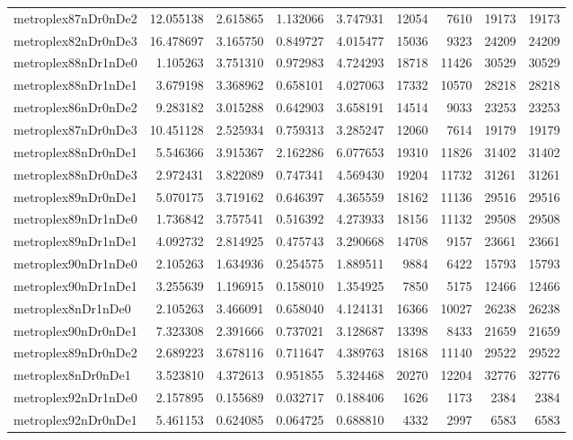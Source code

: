 \begin{longtable}{|l|r|r|r|r|r|r|r|r|}
metroplex87nDr0nDe2 & 12.055138 & 2.615865 & 1.132066 & 3.747931 & 12054 & 7610 & 19173 & 19173 \\
metroplex82nDr0nDe3 & 16.478697 & 3.165750 & 0.849727 & 4.015477 & 15036 & 9323 & 24209 & 24209 \\
metroplex88nDr1nDe0 & 1.105263 & 3.751310 & 0.972983 & 4.724293 & 18718 & 11426 & 30529 & 30529 \\
metroplex88nDr1nDe1 & 3.679198 & 3.368962 & 0.658101 & 4.027063 & 17332 & 10570 & 28218 & 28218 \\
metroplex86nDr0nDe2 & 9.283182 & 3.015288 & 0.642903 & 3.658191 & 14514 & 9033 & 23253 & 23253 \\
metroplex87nDr0nDe3 & 10.451128 & 2.525934 & 0.759313 & 3.285247 & 12060 & 7614 & 19179 & 19179 \\
metroplex88nDr0nDe1 & 5.546366 & 3.915367 & 2.162286 & 6.077653 & 19310 & 11826 & 31402 & 31402 \\
metroplex88nDr0nDe3 & 2.972431 & 3.822089 & 0.747341 & 4.569430 & 19204 & 11732 & 31261 & 31261 \\
metroplex89nDr0nDe1 & 5.070175 & 3.719162 & 0.646397 & 4.365559 & 18162 & 11136 & 29516 & 29516 \\
metroplex89nDr1nDe0 & 1.736842 & 3.757541 & 0.516392 & 4.273933 & 18156 & 11132 & 29508 & 29508 \\
metroplex89nDr1nDe1 & 4.092732 & 2.814925 & 0.475743 & 3.290668 & 14708 & 9157 & 23661 & 23661 \\
metroplex90nDr1nDe0 & 2.105263 & 1.634936 & 0.254575 & 1.889511 & 9884 & 6422 & 15793 & 15793 \\
metroplex90nDr1nDe1 & 3.255639 & 1.196915 & 0.158010 & 1.354925 & 7850 & 5175 & 12466 & 12466 \\
metroplex8nDr1nDe0 & 2.105263 & 3.466091 & 0.658040 & 4.124131 & 16366 & 10027 & 26238 & 26238 \\
metroplex90nDr0nDe1 & 7.323308 & 2.391666 & 0.737021 & 3.128687 & 13398 & 8433 & 21659 & 21659 \\
metroplex89nDr0nDe2 & 2.689223 & 3.678116 & 0.711647 & 4.389763 & 18168 & 11140 & 29522 & 29522 \\
metroplex8nDr0nDe1 & 3.523810 & 4.372613 & 0.951855 & 5.324468 & 20270 & 12204 & 32776 & 32776 \\
metroplex92nDr1nDe0 & 2.157895 & 0.155689 & 0.032717 & 0.188406 & 1626 & 1173 & 2384 & 2384 \\
metroplex92nDr0nDe1 & 5.461153 & 0.624085 & 0.064725 & 0.688810 & 4332 & 2997 & 6583 & 6583 \\

\end{longtable}
